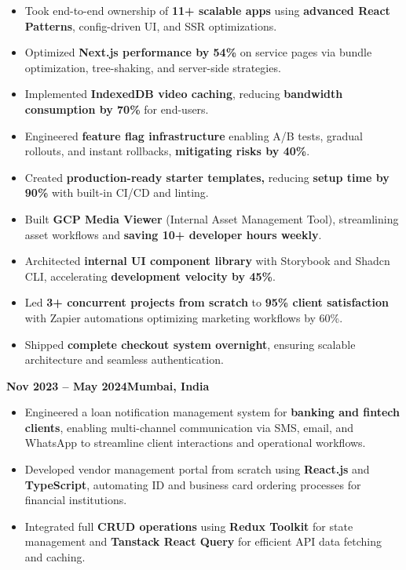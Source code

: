 \documentclass[10pt,a4paper,ragged2e]{altacv}
\begin{document}
\begin{itemize}
\item Took end-to-end ownership of \textbf{11+ scalable apps} using \textbf{advanced React Patterns}, config-driven UI, and SSR optimizations.
\item Optimized \textbf{Next.js performance by 54\%} on service pages via bundle optimization, tree-shaking, and server-side strategies.
\item Implemented \textbf{IndexedDB video caching}, reducing \textbf{bandwidth consumption by 70\%} for end-users.
\item Engineered \textbf{feature flag infrastructure} enabling A/B tests, gradual rollouts, and instant rollbacks, \textbf{mitigating risks by 40\%}.
\item Created \textbf{production-ready starter templates,} reducing \textbf{setup time by 90\%} with built-in CI/CD and linting.
\item Built \textbf{GCP Media Viewer} (Internal Asset Management Tool), streamlining asset workflows and \textbf{saving 10+ developer hours weekly}.
\item Architected \textbf{internal UI component library} with Storybook and Shadcn CLI, accelerating \textbf{development velocity by 45\%}.
\item Led \textbf{3+ concurrent projects from scratch} to \textbf{95\% client satisfaction} with Zapier automations optimizing marketing workflows by 60\%.
\item Shipped \textbf{complete checkout system overnight}, ensuring scalable architecture and seamless authentication.
\end{itemize}

\divider

{\textbf{Nov 2023 -- May 2024}}{\textbf{Mumbai, India}}
\begin{itemize}
\item Engineered a loan notification management system for \textbf{banking and fintech clients}, enabling multi-channel communication via SMS, email, and WhatsApp to streamline client interactions and operational workflows.
\smallskip
\item Developed vendor management portal from scratch using \textbf{React.js} and \textbf{TypeScript}, automating ID and business card ordering processes for financial institutions.
\smallskip
\item Integrated full \textbf{CRUD operations} using \textbf{Redux Toolkit} for state management and \textbf{Tanstack React Query} for efficient API data fetching and caching.
\end{itemize}
\end{document}

